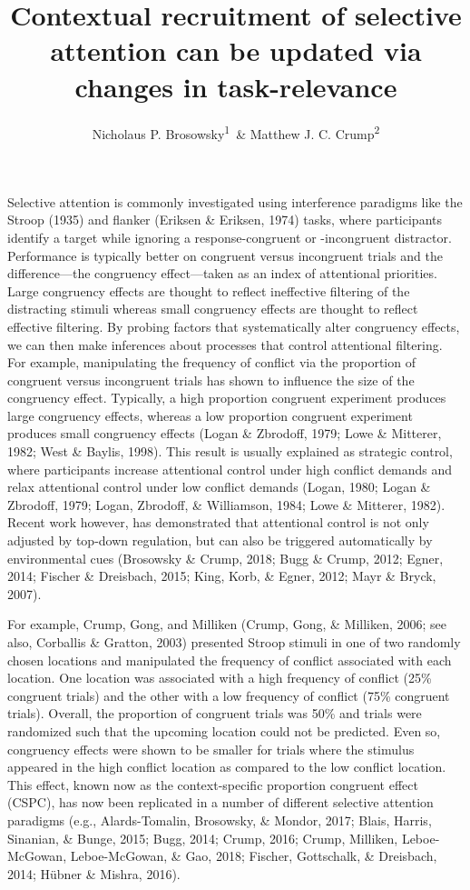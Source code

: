 \documentclass[english,,man,floatsintext]{apa6}
\title{Contextual recruitment of selective attention can be updated via changes in task-relevance}
\author{Nicholaus P. Brosowsky\textsuperscript{1}~\& Matthew J. C. Crump\textsuperscript{2}}
\date{}
\affiliation{
\vspace{0.5cm}
\textsuperscript{1} The Graduate Center of the City University of New York\\\textsuperscript{2} Brooklyn College of the City University of New York}
\begin{document}
\maketitle

Selective attention is commonly investigated using interference paradigms like the Stroop (1935) and flanker (Eriksen \& Eriksen, 1974) tasks, where participants identify a target while ignoring a response-congruent or -incongruent distractor. Performance is typically better on congruent versus incongruent trials and the difference---the congruency effect---taken as an index of attentional priorities. Large congruency effects are thought to reflect ineffective filtering of the distracting stimuli whereas small congruency effects are thought to reflect effective filtering. By probing factors that systematically alter congruency effects, we can then make inferences about processes that control attentional filtering. For example, manipulating the frequency of conflict via the proportion of congruent versus incongruent trials has shown to influence the size of the congruency effect. Typically, a high proportion congruent experiment produces large congruency effects, whereas a low proportion congruent experiment produces small congruency effects (Logan \& Zbrodoff, 1979; Lowe \& Mitterer, 1982; West \& Baylis, 1998). This result is usually explained as strategic control, where participants increase attentional control under high conflict demands and relax attentional control under low conflict demands (Logan, 1980; Logan \& Zbrodoff, 1979; Logan, Zbrodoff, \& Williamson, 1984; Lowe \& Mitterer, 1982). Recent work however, has demonstrated that attentional control is not only adjusted by top-down regulation, but can also be triggered automatically by environmental cues (Brosowsky \& Crump, 2018; Bugg \& Crump, 2012; Egner, 2014; Fischer \& Dreisbach, 2015; King, Korb, \& Egner, 2012; Mayr \& Bryck, 2007).

For example, Crump, Gong, and Milliken (Crump, Gong, \& Milliken, 2006; see also, Corballis \& Gratton, 2003) presented Stroop stimuli in one of two randomly chosen locations and manipulated the frequency of conflict associated with each location. One location was associated with a high frequency of conflict (25\% congruent trials) and the other with a low frequency of conflict (75\% congruent trials). Overall, the proportion of congruent trials was 50\% and trials were randomized such that the upcoming location could not be predicted. Even so, congruency effects were shown to be smaller for trials where the stimulus appeared in the high conflict location as compared to the low conflict location. This effect, known now as the context-specific proportion congruent effect (CSPC), has now been replicated in a number of different selective attention paradigms (e.g., Alards-Tomalin, Brosowsky, \& Mondor, 2017; Blais, Harris, Sinanian, \& Bunge, 2015; Bugg, 2014; Crump, 2016; Crump, Milliken, Leboe-McGowan, Leboe-McGowan, \& Gao, 2018; Fischer, Gottschalk, \& Dreisbach, 2014; Hübner \& Mishra, 2016).
\end{document}
